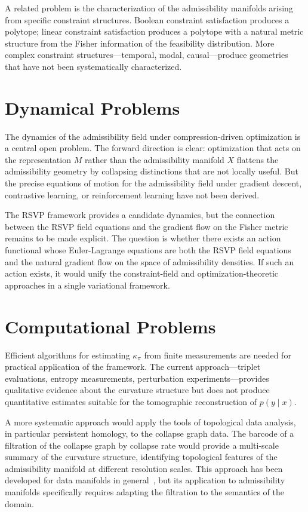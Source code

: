 \documentclass[12pt, oneside]{book}
\theoremstyle{plain-flyxion}
\theoremstyle{definition-flyxion}
\newcommand{\kpi}{\kappa_{\pi}}
\begin{document}
A related problem is the characterization of the admissibility manifolds arising from
specific constraint structures. Boolean constraint satisfaction produces a polytope;
linear constraint satisfaction produces a polytope with a natural metric structure from
the Fisher information of the feasibility distribution. More complex constraint
structures---temporal, modal, causal---produce geometries that have not been
systematically characterized.

\section{Dynamical Problems}

The dynamics of the admissibility field under compression-driven optimization is a central
open problem. The forward direction is clear: optimization that acts on the representation
$M$ rather than the admissibility manifold $X$ flattens the admissibility geometry by
collapsing distinctions that are not locally useful. But the precise equations of motion
for the admissibility field under gradient descent, contrastive learning, or reinforcement
learning have not been derived.

The RSVP framework provides a candidate dynamics, but the connection between the RSVP
field equations and the gradient flow on the Fisher metric remains to be made explicit.
The question is whether there exists an action functional whose Euler-Lagrange equations
are both the RSVP field equations and the natural gradient flow on the space of
admissibility densities. If such an action exists, it would unify the constraint-field and
optimization-theoretic approaches in a single variational framework.

\section{Computational Problems}

Efficient algorithms for estimating $\kpi$ from finite measurements are needed for
practical application of the framework. The current approach---triplet evaluations,
entropy measurements, perturbation experiments---provides qualitative evidence about the
curvature structure but does not produce quantitative estimates suitable for the
tomographic reconstruction of $p(y\mid x)$.

A more systematic approach would apply the tools of topological data analysis, in
particular persistent homology, to the collapse graph data. The barcode of a filtration
of the collapse graph by collapse rate would provide a multi-scale summary of the
curvature structure, identifying topological features of the admissibility manifold at
different resolution scales. This approach has been developed for data manifolds in
general~\cite{carlsson2009}, but its application to admissibility manifolds specifically
requires adapting the filtration to the semantics of the domain.
\end{document}
